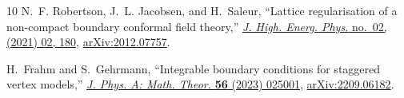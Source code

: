 \documentclass[12pt]{article}
\numberwithin{equation}{section}
\begin{document}
\begin{thebibliography}{10}
		N.~F. Robertson, J.~L. Jacobsen, and H.~Saleur, ``{L}attice regularisation of a
		non-compact boundary conformal field theory,''
		\href{http://dx.doi.org/10.1007/JHEP02(2021)180}{{\em J. High. Energ. Phys.}
			no.~02, (2021) 02, 180}, \href{http://arxiv.org/abs/2012.07757}{{\ttfamily
				arXiv:2012.07757}}.
		
		H.~Frahm and S.~Gehrmann, ``Integrable boundary conditions for staggered vertex
		models,'' \href{http://dx.doi.org/10.1088/1751-8121/acb29f}{{\em J. Phys. A:
				Math. Theor.} {\bfseries 56} (2023) 025001},
		\href{http://arxiv.org/abs/2209.06182}{{\ttfamily arXiv:2209.06182}}.
		
	\end{thebibliography}\endgroup
	
\end{document}
